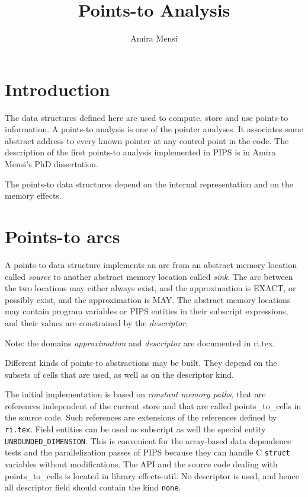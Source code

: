 \documentclass{article}
\title{Points-to Analysis}
\author{Amira Mensi}
\begin{document}
\maketitle

\section{Introduction}

The data structures defined here are used to compute, store and use
points-to information. A points-to analysis is one of the pointer
analyses. It associates some abstract address to every known pointer
at any control point in the code. The description of the first
points-to analysis implemented in PIPS is in Amira Mensi's PhD
dissertation.

The points-to data structures depend on the internal representation
and on the memory effects.

{}
{}
{}
{}

 

\section{Points-to arcs}
 
A points-to data structure implements an arc from an abstract memory location
called {\em source} to another abstract memory location called
{\em sink}. The arc between the two locations may either always exist,
and the approximation is EXACT, or possibly exist, and the
approximation is MAY. The abstract memory locations may contain
program variables or PIPS entities in their subscript expressions, and
their values are constrained by the {\em descriptor}.

{}

Note: the domains {\em approximation} and {\em descriptor} are
documented in ri.tex.

Different kinds of points-to abstractions may be built. They depend on
the subsets of cells that are used, as well as on the descriptor
kind.

The initial implementation is based on {\em constant memory paths},
that are references independent of the current store and that are
called points\_to\_cells in the source code. Such references are
extensions of the references defined by \verb/ri.tex/. Field entities
can be used as subscript as well the special entity
\verb/UNBOUNDED_DIMENSION/. This is convenient for the array-based data
dependence tests and the parallelization passes of PIPS because they
can handle C \verb/struct/ variables without modifications. The API
and the source code dealing with points\_to\_cells is located in
library effects-util. No descriptor is used, and hence all descriptor
field should contain the kind \verb/none/.
\end{document}
